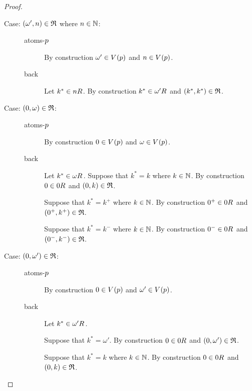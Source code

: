 \begin{proof}
\begin{description}
\begin{description}
        \end{description}
    \item[Case: $(\omega', n) \in \mathfrak{R}$ where $n \in \mathbb{N}$:]\hfill
        \begin{description}
            \item[atoms-$p$]
                By construction $\omega' \in \kValuation(\atomP)$ and $n \in \kValuation(\atomP)$.
            \item[back]
                Let $k^* \in \kSuccessors{}{n}$.
                By construction $k^* \in \kSuccessors{}{\omega'}$ and $(k^*, k^*) \in \mathfrak{R}$.
        \end{description}
    \item[Case: $(0, \omega) \in \mathfrak{R}$:]\hfill
        \begin{description}
            \item[atoms-$p$]
                By construction $0 \in \kValuation(\atomP)$ and $\omega \in \kValuation(\atomP)$.
            \item[back]
                Let $k^* \in \kSuccessors{}{\omega}$.
                Suppose that $k^* = k$ where $k \in \mathbb{N}$.
                By construction $0 \in \kSuccessors{}{0}$ and $(0, k) \in \mathfrak{R}$.

                Suppose that $k^* = k^+$ where $k \in \mathbb{N}$.
                By construction $0^+ \in \kSuccessors{}{0}$ and $(0^+, k^+) \in \mathfrak{R}$.

                Suppose that $k^* = k^-$ where $k \in \mathbb{N}$.
                By construction $0^- \in \kSuccessors{}{0}$ and $(0^-, k^-) \in \mathfrak{R}$.
        \end{description}
    \item[Case: $(0, \omega') \in \mathfrak{R}$:]\hfill
        \begin{description}
            \item[atoms-$p$]
                By construction $0 \in \kValuation(\atomP)$ and $\omega' \in \kValuation(\atomP)$.
            \item[back]
                Let $k^* \in \kSuccessors{}{\omega'}$.

                Suppose that $k^* = \omega'$.
                By construction $0 \in \kSuccessors{}{0}$ and $(0, \omega') \in \mathfrak{R}$.

                Suppose that $k^* = k$ where $k \in \mathbb{N}$.
                By construction $0 \in \kSuccessors{}{0}$ and $(0, k) \in \mathfrak{R}$.


\end{description}
\end{description}
\end{proof}
